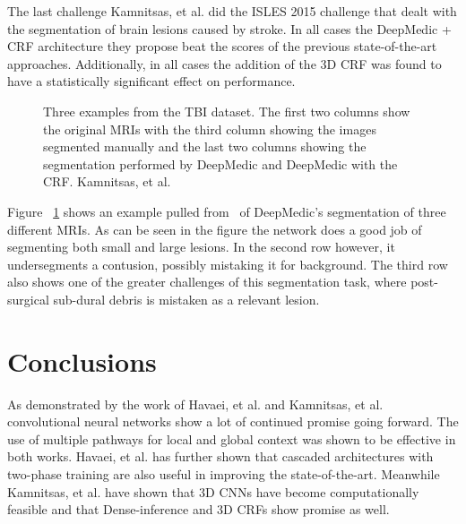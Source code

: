 \documentclass{sig-alternate}
\begin{document}
The last challenge Kamnitsas, et al. did the ISLES 2015 challenge that dealt with the segmentation of brain lesions caused by stroke. In all cases the DeepMedic + CRF architecture they propose beat the scores of the previous state-of-the-art approaches. Additionally, in all cases the addition of the 3D CRF was found to have a statistically significant effect on performance.

\begin{figure*}
\centering
{}
\caption{Kamnitsas, et al. best performnce versus previous state-of-the-arts(BRATS 2015). The bold numbers indicate a statistically significant difference made by the CRF~\cite{Kamnitsas:2017}.}
\label{fig:KamnitsasResults}
\end{figure*}

\begin{figure}
\centering
{}
\caption{Three examples from the TBI dataset. The first two columns show the original MRIs with the third column showing the images segmented manually and the last two columns showing the segmentation performed by DeepMedic and DeepMedic with the CRF. Kamnitsas, et al.~\cite{Kamnitsas:2017}}
\label{fig:TBIVisuals}
\end{figure}

Figure ~\ref{fig:TBIVisuals} shows an example pulled from~\cite{Kamnitsas:2017} of DeepMedic's segmentation of three different MRIs. As can be seen in the figure the network does a good job of segmenting both small and large lesions. In the second row however, it undersegments a contusion, possibly mistaking it for background. The third row also shows one of the greater challenges of this segmentation task, where post-surgical sub-dural debris is mistaken as a relevant lesion.~\cite{Kamnitsas:2017}

\section{Conclusions}
\label{sec:conclusions}

As demonstrated by the work of Havaei, et al. and Kamnitsas, et al. convolutional neural networks show a lot of continued promise going forward. The use of multiple pathways for local and global context was shown to be effective in both works. Havaei, et al. has further shown that cascaded architectures with two-phase training are also useful in improving the state-of-the-art. Meanwhile Kamnitsas, et al. have shown that 3D CNNs have become computationally feasible and that Dense-inference and 3D CRFs show promise as well.
\end{document}
